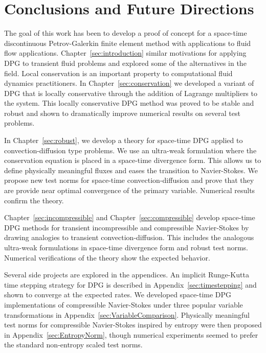 \documentclass[Dissertation.tex]{subfiles}
\begin{document}
\chapter{Conclusions and Future Directions}

The goal of this work has been to develop a proof of concept for a space-time discontinuous Petrov-Galerkin
finite element method with applications to fluid flow applications.
Chapter~\ref{sec:introduction} similar motivations for applying DPG to transient fluid problems and
explored some of the alternatives in the field.
Local conservation is an important property to computational fluid dynamics practitioners.
In Chapter~\ref{sec:conservation} we developed a variant of DPG that is locally conservative through
the addition of Lagrange multipliers to the system.
This locally conservative DPG method was proved to be stable and robust 
and shown to dramatically improve numerical results on several test problems.

In Chapter~\ref{sec:robust}, we develop a theory for space-time DPG applied to convection-diffusion
type problems.
We use an ultra-weak formulation where the conservation equation is placed in a space-time
divergence form. 
This allows us to define physically meaningful fluxes and eases the transition to Navier-Stokes.
We propose new test norms for space-time convection-diffusion and prove that they are provide
near optimal convergence of the primary variable.
Numerical results confirm the theory.

Chapter~\ref{sec:incompressible} and Chapter~\ref{sec:compressible} develop space-time DPG methods 
for transient incompressible and compressible Navier-Stokes
by drawing analogies to transient convection-diffusion. 
This includes the analogous ultra-weak formulations in space-time divergence form
and robust test norms.
Numerical verifications of the theory show the expected behavior.

Several side projects are explored in the appendices. 
An implicit Runge-Kutta time stepping strategy for DPG is described in Appendix~\ref{sec:timestepping}
and shown to converge at the expected rates.
We developed space-time DPG implementations of compressible Navier-Stokes under three popular
variable transformations in Appendix~\ref{sec:VariableComparison}.
Physically meaningful test norms for compressible Navier-Stokes inspired by entropy
were then proposed in Appendix~\ref{sec:EntropyNorm}, though numerical experiments 
seemed to prefer the standard non-entropy scaled test norms.
\end{document}
